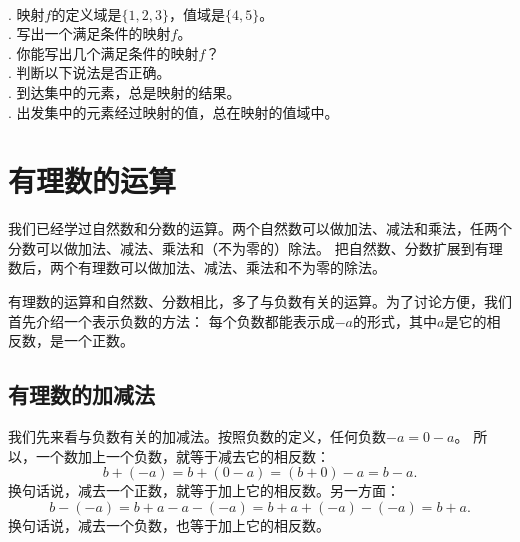 \documentclass[12pt,UTF8,fontset=none]{ctexbook}
\begin{document}
\begin{xt}\label{xt:2-2-0}
    \mbox{} \\
    . 映射$f$的定义域是$\{1,2,3\}$，值域是$\{4,5\}$。\\
    . 写出一个满足条件的映射$f$。\\
    . 你能写出几个满足条件的映射$f$？\\
    . 判断以下说法是否正确。\\
    . 到达集中的元素，总是映射的结果。\\
    . 出发集中的元素经过映射的值，总在映射的值域中。%
\end{xt}

\chapter{有理数的运算}
我们已经学过自然数和分数的运算。两个自然数可以做加法、减法和乘法，任两个分数可以做加法、减法、乘法和（不为零的）除法。
把自然数、分数扩展到有理数后，两个有理数可以做加法、减法、乘法和不为零的除法。

有理数的运算和自然数、分数相比，多了与负数有关的运算。为了讨论方便，我们首先介绍一个表示负数的方法：
每个负数都能表示成$-a$的形式，其中$a$是它的相反数，是一个正数。

\section{有理数的加减法}
我们先来看与负数有关的加减法。按照负数的定义，任何负数$-a = 0 - a$。
所以，一个数加上一个负数，就等于减去它的相反数：
$$ b + (-a) = b + (0 - a) = (b + 0) - a = b - a.$$
换句话说，减去一个正数，就等于加上它的相反数。另一方面：
$$ b - (-a) = b + a - a - (-a) = b + a + (-a) - (-a) = b + a.$$
换句话说，减去一个负数，也等于加上它的相反数。
\end{document}
